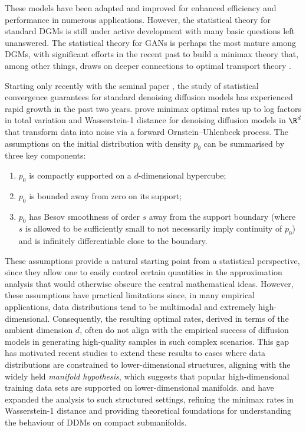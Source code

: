 \documentclass[a4paper, 11pt, headings = small, abstract]{scrartcl}
\begin{document}
These models have been adapted and improved for enhanced efficiency and performance in numerous applications. However, the statistical theory for standard DGMs is still under active development with many basic questions left unanswered. The statistical theory for GANs is perhaps the most mature among DGMs, with significant efforts in the recent past \cite{puchkin24,tang23,schreuder21,chen22,chae22,liang21,stephan24,stephan23} to build a minimax theory that, among other things, draws on deeper connections to optimal transport theory \cite{villani09,chewi24}.

Starting only recently with the seminal paper \cite{oko23}, the study of statistical convergence guarantees for standard denoising diffusion models has experienced rapid growth in the past two years.  \cite{oko23} prove minimax optimal rates up to log factors in total variation and Wasserstein-1 distance  for denoising diffusion models in $\R^d$ that transform data into noise via a forward Ornstein--Uhlenbeck process. The assumptions on the initial distribution with density $p_0$ can be summarised by three key components: 
\begin{enumerate}[label = (\roman*)]
\item $p_0$ is compactly supported on a $d$-dimensional hypercube; 
\item $p_0$ is bounded away from zero on its support;
\item $p_0$ has Besov smoothness of order $s$ away from the support boundary (where $s$ is allowed to be sufficiently small to not necessarily imply continuity of $p_0$) and is infinitely differentiable close to the boundary.
\end{enumerate}
These assumptions provide a natural starting point from a statistical perspective, since they allow one to easily control certain quantities in the approximation analysis that would otherwise obscure the central mathematical ideas. However, these assumptions have practical limitations since, in many empirical applications, data distributions tend to be multimodal and extremely high-dimensional. Consequently, the resulting optimal rates, derived in terms of the ambient dimension $d$, often do not align with the empirical success of diffusion models in generating high-quality samples in such complex scenarios. This gap has motivated recent studies to extend these results to cases where data distributions are constrained to lower-dimensional structures, aligning with the widely held \emph{manifold hypothesis}, which suggests that popular high-dimensional training data sets are supported on lower-dimensional manifolds. \cite{chen23b} and \cite{tang24} have expanded the analysis to such structured settings, refining the minimax rates in Wasserstein-1 distance and providing theoretical foundations for understanding the behaviour of DDMs on compact submanifolds.
\end{document}

